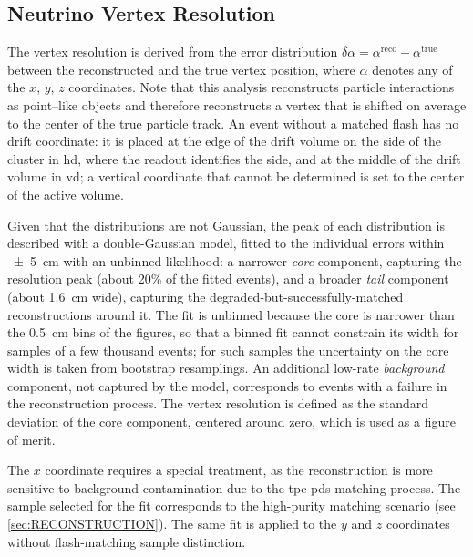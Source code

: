 \subsection{Neutrino Vertex Resolution}\label{sec:VERTEX_RESOLUTION}
The vertex resolution is derived from the error distribution $\delta\alpha = \alpha^\text{reco} - \alpha^\text{true}$ between the reconstructed and the true vertex position, where $\alpha$ denotes any of the $x$, $y$, $z$ coordinates. Note that this analysis reconstructs particle interactions as point--like objects and therefore reconstructs a vertex that is shifted on average to the center of the true particle track. An event without a matched flash has no drift coordinate: it is placed at the edge of the drift volume on the side of the cluster in \gls{hd}, where the readout identifies the side, and at the middle of the drift volume in \gls{vd}; a vertical coordinate that cannot be determined is set to the center of the active volume. 

Given that the distributions are not Gaussian, the peak of each distribution is described with a double-Gaussian model, fitted to the individual errors within \SI{\pm 5}{\centi\meter} with an unbinned likelihood: a narrower \textit{core} component, capturing the resolution peak (about \num{20}\% of the fitted events), and a broader \textit{tail} component (about \SI{1.6}{\centi\meter} wide), capturing the degraded-but-successfully-matched reconstructions around it. The fit is unbinned because the core is narrower than the \SI{0.5}{\centi\meter} bins of the figures, so that a binned fit cannot constrain its width for samples of a few thousand events; for such samples the uncertainty on the core width is taken from bootstrap resamplings. An additional low-rate \textit{background} component, not captured by the model, corresponds to events with a failure in the reconstruction process. The vertex resolution is defined as the standard deviation of the core component, centered around zero, which is used as a figure of merit.

The $x$ coordinate requires a special treatment, as the reconstruction is more sensitive to background contamination due to the \gls{tpc}-\gls{pds} matching process. The sample selected for the fit corresponds to the high-purity matching scenario (see \cref{sec:RECONSTRUCTION}). The same fit is applied to the $y$ and $z$ coordinates without flash-matching sample distinction.

